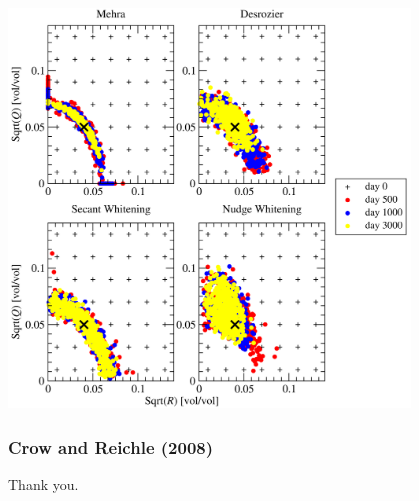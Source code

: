 \documentclass[mathserif]{beamer}
\begin{document}
\begin{frame}
  \begin{center}
  \frametitle{\insertsection}
  \includegraphics[width=0.8\textwidth]{days}
  \end{center}
\end{frame}

\begin{frame}
  \frametitle{Crow and Reichle (2008)}
\begin{centering}
  Thank you.
\end{centering}
\end{frame}



\end{document}
